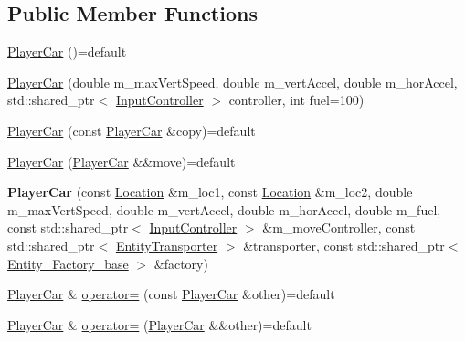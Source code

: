 \subsection*{Public Member Functions}
\begin{DoxyCompactItemize}
\item 
\hyperlink{classroadfighter_1_1PlayerCar_ada20f509f074df30613ecfe09e80c79e}{Player\+Car} ()=default
\item 
\hyperlink{classroadfighter_1_1PlayerCar_a0e4db8cf7fc38214fa0383e1518ab2a2}{Player\+Car} (double m\+\_\+max\+Vert\+Speed, double m\+\_\+vert\+Accel, double m\+\_\+hor\+Accel, std\+::shared\+\_\+ptr$<$ \hyperlink{classroadfighter_1_1InputController}{Input\+Controller} $>$ controller, int fuel=100)
\item 
\hyperlink{classroadfighter_1_1PlayerCar_a89f593714201e6d8252abd19125c7c88}{Player\+Car} (const \hyperlink{classroadfighter_1_1PlayerCar}{Player\+Car} \&copy)=default
\item 
\hyperlink{classroadfighter_1_1PlayerCar_a1243a4b2ec289c99884cb1c5f8a57531}{Player\+Car} (\hyperlink{classroadfighter_1_1PlayerCar}{Player\+Car} \&\&move)=default
\item 
\mbox{\label{classroadfighter_1_1PlayerCar_a50481f68beb27eeb71c3ecb7ea5bf4a1}} 
{\bfseries Player\+Car} (const \hyperlink{classroadfighter_1_1Location}{Location} \&m\+\_\+loc1, const \hyperlink{classroadfighter_1_1Location}{Location} \&m\+\_\+loc2, double m\+\_\+max\+Vert\+Speed, double m\+\_\+vert\+Accel, double m\+\_\+hor\+Accel, double m\+\_\+fuel, const std\+::shared\+\_\+ptr$<$ \hyperlink{classroadfighter_1_1InputController}{Input\+Controller} $>$ \&m\+\_\+move\+Controller, const std\+::shared\+\_\+ptr$<$ \hyperlink{classroadfighter_1_1EntityTransporter}{Entity\+Transporter} $>$ \&transporter, const std\+::shared\+\_\+ptr$<$ \hyperlink{classroadfighter_1_1Entity__Factory__base}{Entity\+\_\+\+Factory\+\_\+base} $>$ \&factory)
\item 
\hyperlink{classroadfighter_1_1PlayerCar}{Player\+Car} \& \hyperlink{classroadfighter_1_1PlayerCar_a1913e3231449aa67ad450ac15267086b}{operator=} (const \hyperlink{classroadfighter_1_1PlayerCar}{Player\+Car} \&other)=default
\item 
\hyperlink{classroadfighter_1_1PlayerCar}{Player\+Car} \& \hyperlink{classroadfighter_1_1PlayerCar_aa6938d2531fea4938eb0837fb2763304}{operator=} (\hyperlink{classroadfighter_1_1PlayerCar}{Player\+Car} \&\&other)=default
\item 

\end{DoxyCompactItemize}

